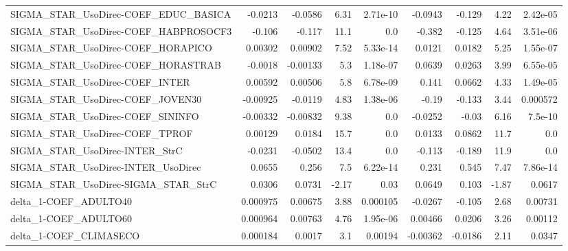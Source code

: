 \begin{tabular}{lrrrrrrrr}
SIGMA\_STAR\_UsoDirec-COEF\_EDUC\_BASICA &     -0.0213 &      -0.0586 &    6.31 & 2.71e-10 &    -0.0943 &      -0.129 &         4.22 &      2.42e-05 \\
SIGMA\_STAR\_UsoDirec-COEF\_HABPROSOCF3 &      -0.106 &       -0.117 &    11.1 &      0.0 &     -0.382 &      -0.125 &         4.64 &      3.51e-06 \\
SIGMA\_STAR\_UsoDirec-COEF\_HORAPICO    &     0.00302 &      0.00902 &    7.52 & 5.33e-14 &     0.0121 &      0.0182 &         5.25 &      1.55e-07 \\
SIGMA\_STAR\_UsoDirec-COEF\_HORASTRAB   &     -0.0018 &     -0.00133 &     5.3 & 1.18e-07 &     0.0639 &      0.0263 &         3.99 &      6.55e-05 \\
SIGMA\_STAR\_UsoDirec-COEF\_INTER       &     0.00592 &      0.00506 &     5.8 & 6.78e-09 &      0.141 &      0.0662 &         4.33 &      1.49e-05 \\
SIGMA\_STAR\_UsoDirec-COEF\_JOVEN30     &    -0.00925 &      -0.0119 &    4.83 & 1.38e-06 &      -0.19 &      -0.133 &         3.44 &      0.000572 \\
SIGMA\_STAR\_UsoDirec-COEF\_SININFO     &    -0.00332 &     -0.00832 &    9.38 &      0.0 &    -0.0252 &       -0.03 &         6.16 &       7.5e-10 \\
SIGMA\_STAR\_UsoDirec-COEF\_TPROF       &     0.00129 &       0.0184 &    15.7 &      0.0 &     0.0133 &      0.0862 &         11.7 &           0.0 \\
SIGMA\_STAR\_UsoDirec-INTER\_StrC       &     -0.0231 &      -0.0502 &    13.4 &      0.0 &     -0.113 &      -0.189 &         11.9 &           0.0 \\
SIGMA\_STAR\_UsoDirec-INTER\_UsoDirec   &      0.0655 &        0.256 &     7.5 & 6.22e-14 &      0.231 &       0.545 &         7.47 &      7.86e-14 \\
SIGMA\_STAR\_UsoDirec-SIGMA\_STAR\_StrC  &      0.0306 &       0.0731 &   -2.17 &     0.03 &     0.0649 &       0.103 &        -1.87 &        0.0617 \\
delta\_1-COEF\_ADULTO40                &    0.000975 &      0.00675 &    3.88 & 0.000105 &    -0.0267 &      -0.105 &         2.68 &       0.00731 \\
delta\_1-COEF\_ADULTO60                &    0.000964 &      0.00763 &    4.76 & 1.95e-06 &    0.00466 &      0.0206 &         3.26 &       0.00112 \\
delta\_1-COEF\_CLIMASECO               &    0.000184 &       0.0017 &     3.1 &  0.00194 &   -0.00362 &     -0.0186 &         2.11 &        0.0347 \\

\end{tabular}
